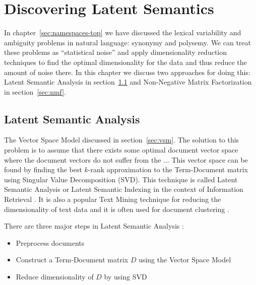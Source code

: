 \section{Discovering Latent Semantics} \label{sec:latent-semantics}
In chapter~\ref{sec:namespaces-top} we have discussed the 
lexical variability and ambiguity problems in natural language: synonymy 
and polysemy. We can treat these problems as ``statistical noise'' and 
apply dimensionality reduction techniques to find the optimal dimensionality
for the data and thus reduce the amount of noise there. 
In this chapter we discuss two approaches for doing this: 
Latent Semantic Analysis in section~\ref{sec:lsa}
and Non-Negative Matrix Factorization in section~\ref{sec:nmf}.





\subsection{Latent Semantic Analysis} \label{sec:lsa}

The Vector Space Model discussed in section~\ref{sec:vsm}.
The solution to this problem is to assume that there exists 
some optimal document vector space where the document vectors
do not suffer from the ... 
This vector space can be found by finding the best $k$-rank approximation 
to the Term-Document matrix using Singular Value Decomposition (SVD). 
This technique is called Latent Semantic Analysis \cite{landauer1998introduction}
or Latent Semantic Indexing in the context of Information Retrieval 
\cite{deerwester1990indexing}. 
It is also a popular Text Mining technique for reducing the dimensionality 
of text data and it is often used for 
document clustering \cite{aggarwal2012survey} \cite{osinski2004lingo}. 


There are three major steps in Latent Semantic Analysis  \cite{evangelopoulos2012latent}:

\begin{itemize}
\itemsep1pt\parskip0pt
\item
  Preprocess documents
\item
  Construct a Term-Document matrix $D$ using the Vector Space Model
\item
  Reduce dimensionality of $D$ by using SVD
\end{itemize}


